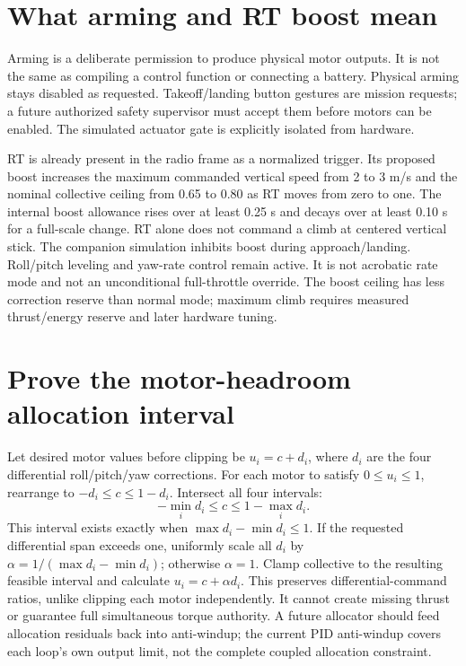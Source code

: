 \section{What arming and RT boost mean}
Arming is a deliberate permission to produce physical motor outputs. It is not
the same as compiling a control function or connecting a battery. Physical
arming stays disabled as requested. Takeoff/landing button gestures are mission
requests; a future authorized safety supervisor must accept them before motors
can be enabled. The simulated actuator gate is explicitly isolated from hardware.

RT is already present in the radio frame as a normalized trigger. Its proposed
boost increases the maximum commanded vertical speed from 2 to 3 m/s and the
nominal collective ceiling from 0.65 to 0.80 as RT moves from zero to one.
The internal boost allowance rises over at least 0.25 s and decays over at least
0.10 s for a full-scale change. RT alone does not command a climb at centered
vertical stick. The companion simulation inhibits boost during approach/landing.
Roll/pitch leveling and yaw-rate control remain active. It is not acrobatic
rate mode and not an unconditional full-throttle override. The boost ceiling
has less correction reserve than normal mode; maximum climb requires measured
thrust/energy reserve and later hardware tuning.

\section{Prove the motor-headroom allocation interval}
Let desired motor values before clipping be $u_i=c+d_i$, where $d_i$ are the
four differential roll/pitch/yaw corrections. For each motor to satisfy
$0\leq u_i\leq1$, rearrange to $-d_i\leq c\leq1-d_i$.
Intersect all four intervals:
\begin{equation}
-\min_i d_i\leq c\leq1-\max_i d_i.
\end{equation}
This interval exists exactly when $\max d_i-\min d_i\leq1$. If the requested
differential span exceeds one, uniformly scale all $d_i$ by
$\alpha=1/(\max d_i-\min d_i)$; otherwise $\alpha=1$. Clamp collective to
the resulting feasible interval and calculate $u_i=c+\alpha d_i$.
This preserves differential-command ratios, unlike clipping each motor
independently. It cannot create missing thrust or guarantee full simultaneous
torque authority. A future allocator should feed allocation residuals back into
anti-windup; the current PID anti-windup covers each loop's own output limit,
not the complete coupled allocation constraint.
